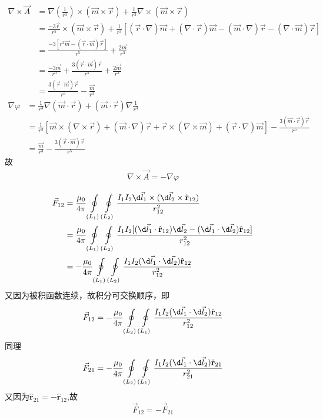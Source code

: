 \documentclass{phyasgn}
\begin{document}
\begin{sol}[2]
  \begin{align*}
    \nabla\times\vec{A}&=\nabla(\frac{1}{r^3})\times(\vec{m}\times\vec{r})+\frac{1}{r^3}\nabla\times(\vec{m}\times\vec{r})\\
    &=\frac{-3\vec{r}}{r^5}\times(\vec{m}\times\vec{r})+\frac{1}{r^3}[(\vec{r}\cdot\nabla)\vec{m}+(\nabla\cdot\vec{r})\vec{m}-(\vec{m}\cdot\nabla)\vec{r}-(\nabla\cdot\vec{m})\vec{r}]\\
    &=\frac{-3[r^2\vec{m}-(\vec{r}\cdot\vec{m})\vec{r}]}{r^5}+\frac{2\vec{m}}{r^3}\\
    &=\frac{-3\vec{m}}{r^3}+\frac{3(\vec{r}\cdot\vec{m})\vec{r}}{r^5}+\frac{2\vec{m}}{r^3}\\
    &=\frac{3(\vec{r}\cdot\vec{m})\vec{r}}{r^5}-\frac{\vec{m}}{r^3}
  \end{align*}
  \begin{align*}
    \nabla\varphi&=\frac{1}{r^3}\nabla(\vec{m}\cdot\vec{r})+(\vec{m}\cdot\vec{r})\nabla\frac{1}{r^3}\\
    &=\frac{1}{r^3}[\vec{m}\times(\nabla\times\vec{r})+(\vec{m}\cdot\nabla)\vec{r}+\vec{r}\times(\nabla\times\vec{m})+(\vec{r}\cdot\nabla)\vec{m}]-\frac{3(\vec{m}\cdot\vec{r})\vec{r}}{r^5}\\
    &=\frac{\vec{m}}{r^3}-\frac{3(\vec{r}\cdot\vec{m})\vec{r}}{r^5}
  \end{align*}  
  故
  \begin{align*}
    \nabla\times\vec{A}=-\nabla\varphi
  \end{align*}
\end{sol}\par

\begin{sol}[4]
  $$\begin{aligned}
        \vec{F}_{12}&=\frac{\mu_0}{4\pi}\oint\limits_{(L_1)}\oint\limits_{(L_2)}\frac{I_1I_2\d \vec{l}_1\times (\d \vec{l}_2\times\hat{\mathbf{r}}_{12})}{r_{12}^2}\\
        &=\frac{\mu_0}{4\pi}\oint\limits_{(L_1)}\oint\limits_{(L_2)}\frac{I_1I_2[(\d \vec{l}_1\cdot \hat{\mathbf{r}}_{12})\d \vec{l}_2-(\d \vec{l}_1\cdot \d \vec{l}_2)\hat{\mathbf{r}}_{12}]}{r_{12}^2}\\
        &=-\frac{\mu_0}{4\pi}\oint\limits_{(L_1)}\oint\limits_{(L_2)}\frac{I_1I_2(\d \vec{l}_1\cdot \d \vec{l}_2)\hat{\mathbf{r}}_{12}}{r_{12}^2}
    \end{aligned}$$
    又因为被积函数连续，故积分可交换顺序，即
    $$\vec{F}_{12}=-\frac{\mu_0}{4\pi}\oint\limits_{(L_2)}\oint\limits_{(L_1)}\frac{I_1I_2(\d \vec{l}_1\cdot \d \vec{l}_2)\hat{\mathbf{r}}_{12}}{r_{12}^2}$$
    同理
    $$\vec{F}_{21}=-\frac{\mu_0}{4\pi}\oint\limits_{(L_2)}\oint\limits_{(L_1)}\frac{I_1I_2(\d \vec{l}_1\cdot \d \vec{l}_2)\hat{\mathbf{r}}_{21}}{r_{21}^2}$$
    又因为$\hat{\mathbf{r}}_{21}=-\hat{\mathbf{r}}_{12}$,故
    $$\vec{F}_{12}=-\vec{F}_{21}$$
\end{sol}\par
\end{document}
